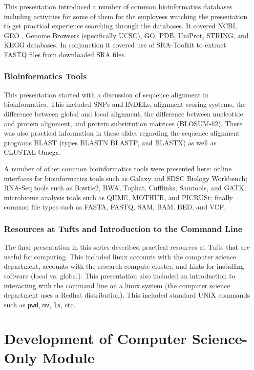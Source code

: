 \documentclass{report}
\begin{document}
This presentation introduced a number of common bioinformatics databases including activities for some of them for the employees watching the presentation to get practical experience searching through the databases. It covered NCBI, GEO , Genome Browsers (specifically UCSC), GO, PDB, UniProt, STRING, and KEGG databases. In conjunction it covered use of SRA-Toolkit to extract FASTQ files from downloaded SRA files.

\subsection{Bioinformatics Tools}
This presentation started with a discussion of sequence alignment in bioinformatics. This included SNPs and INDELs, alignment scoring systems, the difference between global and local alignment, the difference between nucleotide and protein alignment, and protein substitution matrices (BLOSUM-62). There was also practical information in these slides regarding the sequence alignment programs BLAST (types BLASTN BLASTP, and BLASTX) as well as CLUSTAL Omega.

A number of other common bioinformatics tools were presented here: online interfaces for bioinformatics tools such as Galaxy and SDSC Biology Workbench; RNA-Seq tools such as Bowtie2, BWA, Tophat, Cufflinks, Samtools, and GATK; microbiome analysis tools such as QIIME, MOTHUR, and PICRUSt; finally common file types such as FASTA, FASTQ, SAM, BAM, BED, and VCF.

\subsection{Resources at Tufts and Introduction to the Command Line}
The final presentation in this series described practical resources at Tufts that are useful for computing. This included linux accounts with the computer science department, accounts with the research compute cluster, and hints for installing software (local vs. global). This presentation also included an introduction to interacting with the command line on a linux system (the computer science department uses a Redhat distribution). This included standard UNIX commands such as \texttt{pwd}, \texttt{mv}, \texttt{ls}, etc.


\chapter{Development of Computer Science-Only Module}
\end{document}
